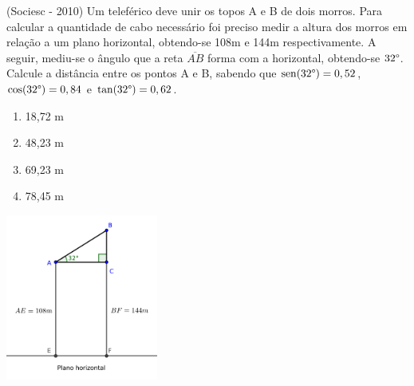 \begin{exer}
 (Sociesc - 2010) Um teleférico deve unir os topos A e B de dois morros. Para calcular a quantidade de cabo necessário foi preciso medir a altura dos morros em relação a um plano horizontal, obtendo-se 108m e 144m respectivamente. A seguir, mediu-se o ângulo que a reta $\overline{AB}$ forma com a horizontal, obtendo-se $32\degree$. Calcule a distância entre os pontos A e B, sabendo que $\operatorname{sen} (32\degree)= 0,52$, $\cos (32\degree)= 0,84$ e $\tan (32\degree)= 0,62$.

 \begin{multicols}{2}

 \begin{enumerate}
  \item 18,72 m
  \item 48,23 m
  \item 69,23 m
  \item 78,45 m
 \end{enumerate}

 \includegraphics[width=5cm]{./cap_trigon/figs/tri_ret_exer3}

 \end{multicols}
 \end{exer}
 
